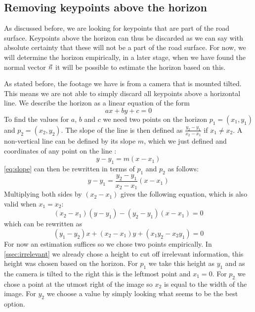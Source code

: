 \subsection{Removing keypoints above the horizon}
As discussed before, we are looking for keypoints that are part of the road surface. Keypoints above the horizon can thus be discarded as we can say with absolute certainty that these will not be a part of the road surface. For now, we will determine the horizon empirically, in a later stage, when we have found the normal vector $\vec n$ it will be possible to estimate the horizon based on this.\bigskip

As stated before, the footage we have is from a camera that is mounted tilted. This means we are not able to simply discard all keypoints above a horizontal line. We describe the horizon as a linear equation of the form
\begin{equation}\label{eq:linear}
    ax + by + c = 0
\end{equation}
To find the values for $a$, $b$ and $c$ we need two points on the horizon $p_1 = (x_1, y_1)$ and $ p_2 = (x_2, y_2)$. The slope of the line is then defined as $\frac{y_2-y_1}{x_2-x_1}$ if $x_1 \neq x_2$. A non-vertical line can be defined by its slope $m$, which we just defined and coordinates of any point on the line \cite{wiki_linear}:
\begin{equation}\label{eq:slope}
    y - y_1 = m(x-x_1)
\end{equation}
\autoref{eq:slope} can then be rewritten in terms of $p_1$ and $p_2$ as follows:
\begin{equation}
    y - y_1 = \frac{y_2-y_1}{x_2-x_1}(x-x_1)
\end{equation}
Multiplying both sides by $(x_2-x_1)$ gives the following equation, which is also valid when $x_1 = x_2$:
\begin{equation}
    (x_2-x_1)(y-y_1) - (y_2-y_1)(x-x_1) = 0
\end{equation}
which can be rewritten as
\begin{equation}
    (y_1-y_2)x + (x_2-x_1)y + (x_1y_2-x_2y_1) = 0
\end{equation}
For now an estimation suffices so we chose two points empirically. In \autoref{ssec:irrelevant} we already chose a height to cut off irrelevant information, this height was chosen based on the horizon. For $p_1$ we take this height as $y_1$ and as the camera is tilted to the right this is the leftmost point and $x_1 = 0$. For $p_2$ we chose a point at the utmost right of the image so $x_2$ is equal to the width of the image. For $y_2$ we choose a value by simply looking what seems to be the best option. \bigskip

